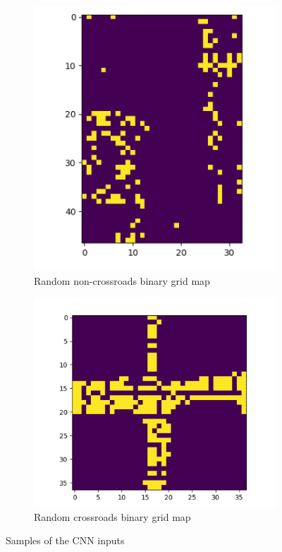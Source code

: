 \documentclass[11pt]{article}
\begin{document}
    \begin{figure}
        \centering
        \begin{subfigure}{0.45\textwidth}
            \centering
            \includegraphics[width=\linewidth]{images/experiment/dataset_0}
            \caption{Random non-crossroads binary grid map}
        \end{subfigure}
        \hfill
        \begin{subfigure}{0.45\textwidth}
            \centering
            \includegraphics[width=\linewidth]{images/experiment/dataset_1}
            \caption{Random crossroads binary grid map}
        \end{subfigure}
        \caption{Samples of the CNN inputs}
        \label{fig:ply_ml_dataset}
    \end{figure}
\end{document}
